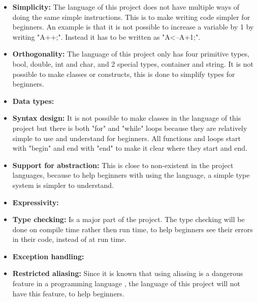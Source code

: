 \begin{itemize}
\item \textbf{Simplicity:} The language of this project does not have multiple ways of doing the same simple instructions. This is to make writing code simpler for beginners. An example is that it is not possible to increase a variable by 1 by writing "A++;". Instead it has to be written as "A<--A+1;".

\item \textbf{Orthogonality:} The language of this project only has four primitive types, bool, double, int and char, and 2 special types, container and string. It is not possible to make classes or constructs, this is done to simplify types for beginners.

\item \textbf{Data types:} 

\item \textbf{Syntax design:} It is not possible to make classes in the language of this project but there is both "for" and "while" loops because they are relatively simple to use and understand for beginners. All functions and loops start with "begin" and end with "end" to make it clear where they start and end.

\item \textbf{Support for abstraction:} This is close to non-existent in the project languages, because to help beginners with using the language, a simple  type system is simpler to understand.

\item \textbf{Expressivity:} 

\item \textbf{Type checking:} Is a major part of the project. The type checking will be done on compile time rather then run time, to help beginners see their errors in their code, instead of at run time.

\item \textbf{Exception handling:} 

\item \textbf{Restricted aliasing:} Since it is known that using aliasing is a dangerous feature in a programming language , the language of this project will not have this feature, to help beginners.
\end{itemize}
